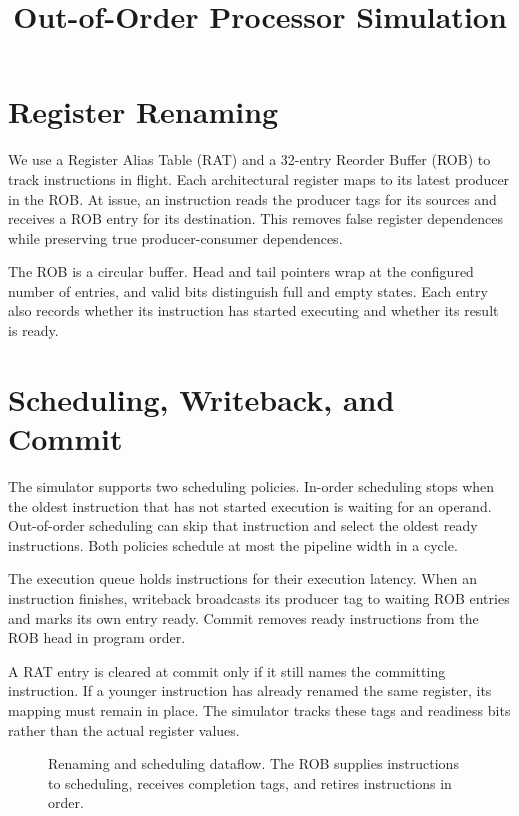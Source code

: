 \documentclass{article}
\title{Out-of-Order Processor Simulation}
\author{}
\date{}
\begin{document}
\maketitle


\section{Register Renaming}
We use a Register Alias Table (RAT) and a 32-entry Reorder Buffer (ROB) to track instructions in flight. Each architectural register maps to its latest producer in the ROB. At issue, an instruction reads the producer tags for its sources and receives a ROB entry for its destination. This removes false register dependences while preserving true producer-consumer dependences.

The ROB is a circular buffer. Head and tail pointers wrap at the configured number of entries, and valid bits distinguish full and empty states. Each entry also records whether its instruction has started executing and whether its result is ready.

\section{Scheduling, Writeback, and Commit}
The simulator supports two scheduling policies. In-order scheduling stops when the oldest instruction that has not started execution is waiting for an operand. Out-of-order scheduling can skip that instruction and select the oldest ready instructions. Both policies schedule at most the pipeline width in a cycle.

The execution queue holds instructions for their execution latency. When an instruction finishes, writeback broadcasts its producer tag to waiting ROB entries and marks its own entry ready. Commit removes ready instructions from the ROB head in program order.

A RAT entry is cleared at commit only if it still names the committing instruction. If a younger instruction has already renamed the same register, its mapping must remain in place. The simulator tracks these tags and readiness bits rather than the actual register values.


\begin{figure}[H]\centering

\caption{Renaming and scheduling dataflow. The ROB supplies instructions to scheduling, receives completion tags, and retires instructions in order.}\label{fig:architecture}
\end{figure}
\end{document}

